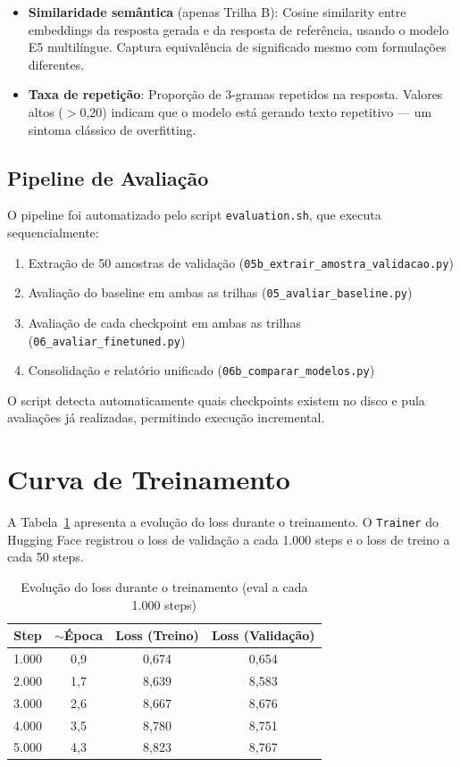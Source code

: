 \begin{itemize}
    \item \textbf{Similaridade semântica} (apenas Trilha B): Cosine similarity entre embeddings da resposta gerada e da resposta de referência, usando o modelo E5 multilíngue. Captura equivalência de significado mesmo com formulações diferentes.
    \item \textbf{Taxa de repetição}: Proporção de 3-gramas repetidos na resposta. Valores altos ($>$0,20) indicam que o modelo está gerando texto repetitivo --- um sintoma clássico de overfitting.
\end{itemize}

\subsection{Pipeline de Avaliação}

O pipeline foi automatizado pelo script \texttt{evaluation.sh}, que executa sequencialmente:

\begin{enumerate}
    \item Extração de 50 amostras de validação (\texttt{05b\_extrair\_amostra\_validacao.py})
    \item Avaliação do baseline em ambas as trilhas (\texttt{05\_avaliar\_baseline.py})
    \item Avaliação de cada checkpoint em ambas as trilhas (\texttt{06\_avaliar\_finetuned.py})
    \item Consolidação e relatório unificado (\texttt{06b\_comparar\_modelos.py})
\end{enumerate}

O script detecta automaticamente quais checkpoints existem no disco e pula avaliações já realizadas, permitindo execução incremental.

\section{Curva de Treinamento}
\label{sec:curva-treinamento}

A Tabela~\ref{tab:loss-steps} apresenta a evolução do loss durante o treinamento. O \texttt{Trainer} do Hugging Face registrou o loss de validação a cada 1.000 steps e o loss de treino a cada 50 steps.

\begin{table}[H]
\centering
\caption{Evolução do loss durante o treinamento (eval a cada 1.000 steps)}
\label{tab:loss-steps}
\begin{tabular}{cccc}
\toprule
\textbf{Step} & \textbf{$\sim$Época} & \textbf{Loss (Treino)} & \textbf{Loss (Validação)} \\
\midrule
1.000 & 0,9 & 0,674 & 0,654 \\
2.000 & 1,7 & 8,639 & 8,583 \\
3.000 & 2,6 & 8,667 & 8,676 \\
4.000 & 3,5 & 8,780 & 8,751 \\
5.000 & 4,3 & 8,823 & 8,767 \\
\bottomrule
\end{tabular}
\end{table}

